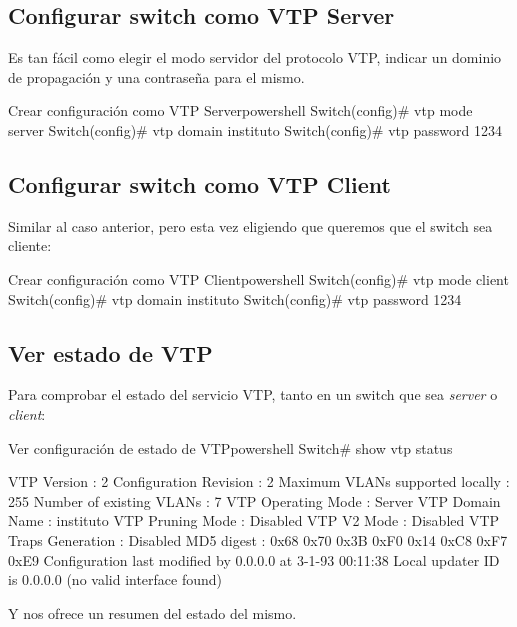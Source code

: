\subsection{Configurar switch como VTP Server}
Es tan fácil como elegir el modo servidor del protocolo VTP, indicar un dominio de propagación y una contraseña para el mismo.

\begin{mycode}{Crear configuración como VTP Server}{powershell}{}
Switch(config)# vtp mode server
Switch(config)# vtp domain instituto
Switch(config)# vtp password 1234
\end{mycode}

\subsection{Configurar switch como VTP Client}
Similar al caso anterior, pero esta vez eligiendo que queremos que el switch sea cliente:

\begin{mycode}{Crear configuración como VTP Client}{powershell}{}
    Switch(config)# vtp mode client
    Switch(config)# vtp domain instituto
    Switch(config)# vtp password 1234
\end{mycode}

\subsection{Ver estado de VTP}
Para comprobar el estado del servicio VTP, tanto en un switch que sea \textit{server} o \textit{client}:

\begin{mycode}{Ver configuración de estado de VTP}{powershell}{{\small}}
Switch# show vtp status

VTP Version                     : 2
Configuration Revision          : 2
Maximum VLANs supported locally : 255
Number of existing VLANs        : 7
VTP Operating Mode              : Server
VTP Domain Name                 : instituto
VTP Pruning Mode                : Disabled
VTP V2 Mode                     : Disabled
VTP Traps Generation            : Disabled
MD5 digest                      : 0x68 0x70 0x3B 0xF0 0x14 0xC8 0xF7 0xE9
Configuration last modified by 0.0.0.0 at 3-1-93 00:11:38
Local updater ID is 0.0.0.0 (no valid interface found)
\end{mycode}

Y nos ofrece un resumen del estado del mismo.




